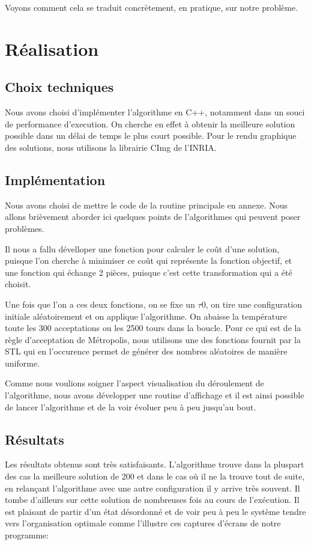 \documentclass{report}
\begin{document}
Voyons comment cela se traduit concrètement, en pratique, sur notre problème.

\section{Réalisation}
\subsection{Choix techniques}
Nous avons choisi d'implémenter l'algorithme en C++, notamment dans un souci de performance d'execution. On cherche en effet à obtenir la meilleure solution possible dans un délai de temps le plus court possible. Pour le rendu graphique des solutions, nous utilisons la librairie CImg de l'INRIA.

\subsection{Implémentation}
Nous avons choisi de mettre le code de la routine principale en annexe. Nous allons brièvement aborder ici quelques points de l'algorithmes qui peuvent poser problèmes.

Il nous a fallu dévelloper une fonction pour calculer le coût d'une solution, puisque l'on cherche à minimiser ce coût qui représente la fonction objectif, et une fonction qui échange 2 pièces, puisque c'est cette transformation qui a été choisit.

Une fois que l'on a ces deux fonctions, on se fixe un $\tau 0$, on tire une configuration initiale aléatoirement et on applique l'algorithme. On abaisse la température toute les 300 acceptations ou les 2500 tours dans la boucle. Pour ce qui est de la règle d'acceptation de Métropolis, nous utilisons une des fonctions fournit par la STL qui en l'occurence permet de générer des nombres aléatoires de manière uniforme.

Comme nous voulions soigner l'aspect visualisation du déroulement de l'algorithme, nous avons développer une routine d'affichage et il est ainsi possible de lancer l'algorithme et de la voir évoluer peu à peu jusqu'au bout.

\subsection{Résultats}
Les résultats obtenus sont très satisfaisants. L'algorithme trouve dans la pluspart des cas la meilleure solution de 200 et dans le cas où il ne la trouve tout de suite, en relançant l'algorithme avec une autre configuration il y arrive très souvent. Il tombe d'ailleurs sur cette solution de nombreuses fois au cours de l'exécution. Il est plaisant de partir d'un état désordonné et de voir peu à peu le système tendre vers l'organisation optimale comme l'illustre ces captures d'écrans de notre programme:
\end{document}
